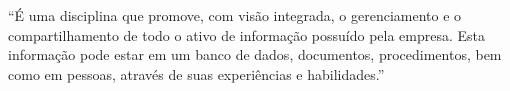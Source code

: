 ``É uma disciplina que promove, com visão integrada, o gerenciamento e o compartilhamento de todo o ativo de informação possuído pela empresa. Esta informação pode estar em um banco de dados, documentos, procedimentos, bem como em pessoas, através de suas experiências e habilidades.''


